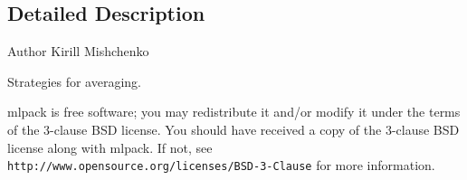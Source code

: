 \subsection{Detailed Description}
\begin{DoxyAuthor}{Author}
Kirill Mishchenko
\end{DoxyAuthor}
Strategies for averaging.

mlpack is free software; you may redistribute it and/or modify it under the terms of the 3-\/clause B\+SD license. You should have received a copy of the 3-\/clause B\+SD license along with mlpack. If not, see {\tt http\+://www.\+opensource.\+org/licenses/\+B\+S\+D-\/3-\/\+Clause} for more information. 